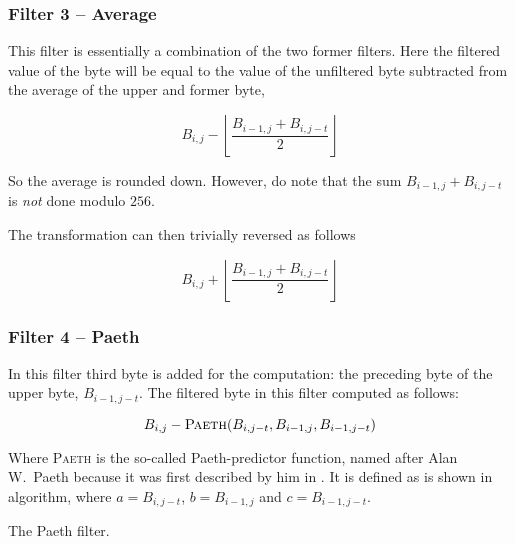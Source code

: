 \subsubsection{Filter 3 -- Average}

This filter is essentially a combination of the two former
filters. Here the filtered value of the byte will be equal to the
value of the unfiltered byte subtracted from the average of the upper
and former byte,

\begin{equation*}
  B_{i,j} - \left \lfloor \frac{B_{i-1,j} +
    B_{i,j-t}}{2} \right \rfloor
\end{equation*}

So the average is rounded down. However, do note that the sum $B_{i-1,j} +
    B_{i,j-t}$ is \textit{not} done modulo $256$.

The transformation can then trivially reversed as follows

\begin{equation*}
  B_{i,j} + \left \lfloor \frac{B_{i-1,j} +
    B_{i,j-t}}{2} \right \rfloor
\end{equation*}


\subsubsection{Filter 4 -- Paeth}

In this filter third byte is added for the computation: the preceding
byte of the upper byte, $B_{i-1,j-t}$. The filtered byte in this
filter computed as follows:

\begin{equation*}
  B_{i,j} - \textsc{Paeth}(B_{i,j-t},B_{i-1,j},B_{i-1,j-t})
\end{equation*}

Where \textsc{Paeth} is the so-called Paeth-predictor function, named
after Alan W.~Paeth because it was first described by him in
\cite{arvo1994graphics_gems}. It is defined as is shown in algorithm,
where $a=B_{i,j-t}$, $b=B_{i-1,j}$ and $c=B_{i-1,j-t}$.


\begin{algorithm}[H]
  \caption{The Paeth filter.}
  \label{alg:paeth}
  \begin{algorithmic}[1]
    \State {}
    \State {}
    \Else
    \State {}
    \EndIf
    \EndProcedure
  \end{algorithmic}
\end{algorithm}


